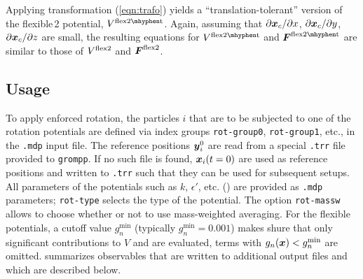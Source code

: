 Applying transformation (\ref{eqn:trafo}) yields a ``translation-tolerant''
version of the flexible\,2 potential, $V\rotflextwot$. Again,
assuming that $\partial \mbox{\boldmath ${x}$}_c / \partial x$,  $\partial \mbox{\boldmath ${x}$}_c /
\partial y$, $\partial \mbox{\boldmath ${x}$}_c / \partial z$ are small, the
resulting equations for $V\rotflextwot$ and $\ve{F}\rotflextwot$ are
similar to those of $V^\mathrm{flex2}$ and $\mbox{\boldmath ${F}$}^\mathrm{flex2}$.

\subsection{Usage}
To apply enforced rotation, the particles $i$ that are to
be subjected to one of the rotation potentials are defined via index groups
{\tt rot-group0}, {\tt rot-group1}, etc., in the {\tt .mdp} input file. 
The reference positions $\mbox{\boldmath ${y}$}_i^0$ are
read from a special {\tt .trr} file provided to {\tt grompp}. If no such file is found,
$\mbox{\boldmath ${x}$}_i(t=0)$ are used as reference positions and written to {\tt .trr} such
that they can be used for subsequent setups. All parameters of the potentials
such as $k$, $\epsilon'$, etc. () are provided as {\tt .mdp}
parameters; {\tt rot-type} selects the type of the potential. 
The option {\tt rot-massw} allows to choose whether or not to use
mass-weighted averaging. 
For the flexible potentials, a cutoff value $g_n^\mathrm{min}$ 
(typically  $g_n^\mathrm{min}=0.001$) makes shure that only
significant contributions to $V$ and  are evaluated, {\ie} terms with 
$g_n(\mbox{\boldmath ${x}$}) < g_n^\mathrm{min}$ are omitted.
 summarizes observables that are written
to additional output files and which are described below.


